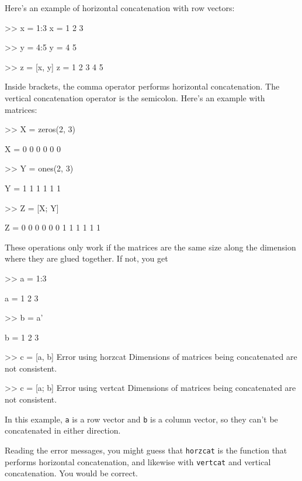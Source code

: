 
Here's an example of horizontal concatenation with row vectors:

\begin{code}
>> x = 1:3
x = 1     2     3

>> y = 4:5
y = 4     5

>> z = [x, y]
z = 1     2     3     4     5
\end{code}

Inside brackets, the comma operator performs horizontal concatenation.
The vertical concatenation operator is the semicolon.  Here's an
example with matrices:


\begin{code}
>> X = zeros(2, 3)

X =  0     0     0
     0     0     0

>> Y = ones(2, 3)

Y =  1     1     1
     1     1     1

>> Z = [X; Y]

Z =  0     0     0
     0     0     0
     1     1     1
     1     1     1
\end{code}

These operations only work if the matrices are the same size along
the dimension where they are glued together.  If not, you get

\begin{code}
>> a = 1:3

a = 1     2     3

>> b = a'

b =  1
     2
     3

>> c = [a, b]
Error using horzcat
Dimensions of matrices being concatenated are not consistent.

>> c = [a; b]
Error using vertcat
Dimensions of matrices being concatenated are not consistent.
\end{code}

In this example, \lstinline{a} is a row vector and \lstinline{b} is a column
vector, so they can't be concatenated in either direction.

Reading the error messages, you might guess that \lstinline{horzcat}
is the function that performs horizontal concatenation, and likewise
with \lstinline{vertcat} and vertical concatenation.  You would be correct.

